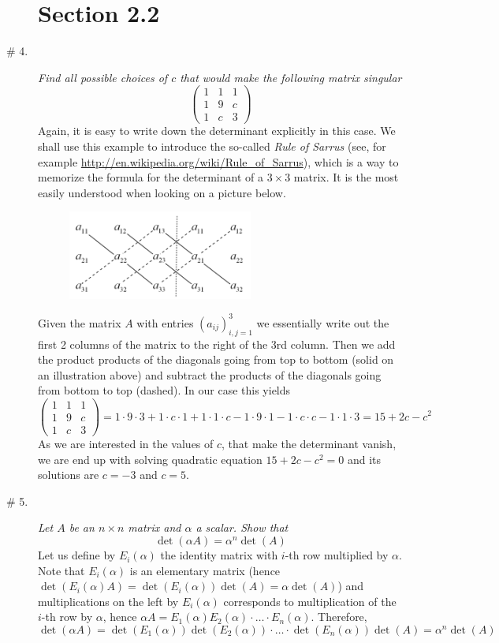 \documentclass[8pt]{article} %
\begin{document}
\begin{description}
\section{Section 2.2}
\item[\# 4.]{{\it Find all possible choices of $c$ that would make the following matrix singular
	\[\begin{pmatrix}1&1&1\\1&9&c\\1&c&3\end{pmatrix}\]}
	Again, it is easy to write down the determinant explicitly in this case. We shall use this example to introduce the so-called {\it Rule
	of Sarrus} (see, for example \url{http://en.wikipedia.org/wiki/Rule_of_Sarrus}), which is a way to memorize the formula for the determinant
	of a $3\times3$ matrix. It is the most easily understood when looking on a picture below.
	\begin{figure}[H]
	\centering
	\includegraphics[width=0.6\textwidth]{sarrus_rule.png}
	\end{figure}
	Given the matrix $A$ with entries $(a_{ij})_{i,j=1}^3$ we essentially write out the first 2 columns of the matrix to the right of the
	3rd column. Then we add the product products of the diagonals going from top to bottom (solid on an illustration above)
	and subtract the products of the diagonals going from bottom to top (dashed). In our case this yields
	\[\begin{pmatrix}1&1&1\\1&9&c\\1&c&3\end{pmatrix}=1\cdot9\cdot3+1\cdot c\cdot 1+1\cdot 1\cdot c-1\cdot 9\cdot1-1\cdot c\cdot c-1\cdot1\cdot
		3=15+2c-c^2\]
		As we are interested in the values of $c$, that make the determinant vanish, we are end up with solving quadratic equation
		$15+2c-c^2=0$ and its solutions are $c=-3$ and $c=5$.
		}
\item[\# 5.]{{\it Let $A$ be an $n\times n$ matrix and $\alpha$ a scalar. Show that \[\det(\alpha A)=\alpha^n\det(A)\]}
	Let us define by $E_i(\alpha)$ the identity matrix with $i$-th row multiplied by $\alpha$. Note that $E_i(\alpha)$ is an elementary
	matrix (hence $\det(E_i(\alpha)A)=\det(E_i(\alpha))\det(A)=\alpha\det(A)$) 
	and multiplications on the left by $E_i(\alpha)$ corresponds to multiplication of the $i$-th row by $\alpha$, hence $\alpha A=E_1(\alpha)
	E_2(\alpha)\cdot\hdots\cdot E_n(\alpha)$. Therefore, 
	\[\det(\alpha A)=\det(E_1(\alpha))\det(E_2(\alpha))\cdot\hdots\cdot\det(E_n(\alpha))\det(A)=\alpha^n\det(A)\]
	}

\end{description}
\end{document}

